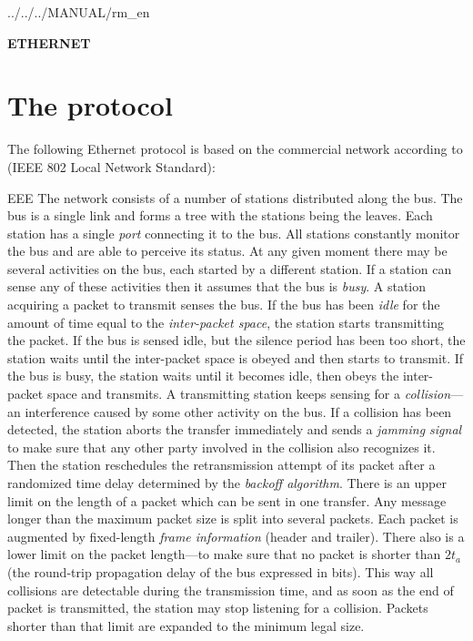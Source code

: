  {../../../MANUAL/rm_en}



\begin{titlepage}

\vspace*{3.5in}
\begin{center}
\Huge\bf ETHERNET \vspace{0.25in}
\end{center}
\end{titlepage}

\section{The protocol}

The following Ethernet protocol is based on the commercial
network according to (IEEE 802 Local Network Standard):
\begin{llist}{EEE}
The network consists of a number of stations distributed along the bus.
The bus is a single link and forms a tree with the stations being the leaves.
Each station has a single {\em port} connecting it to the bus.
All stations constantly monitor the bus and are able to perceive its
status.
At any given moment there may be
several activities on the bus, each started by a different station.
If a station can sense any of these activities
then it assumes that the bus is {\em busy}.
A station acquiring a packet to transmit senses the bus.
If the bus has been {\em idle} for the amount of time equal to the
{\em inter-packet space}, the station starts transmitting the packet.
If the bus is sensed idle, but the silence period has been too short,
the station waits until the inter-packet space is obeyed and then starts to
transmit.
If the bus is busy, the station waits until it becomes idle, then obeys the
inter-packet space and transmits.
A transmitting station keeps sensing for a {\em collision\/}---an
interference caused by some other activity on the bus.
If a collision has been detected, the station
aborts the transfer immediately and sends a
{\em jamming signal} to make sure that
any other party involved in the collision also recognizes it.
Then the station reschedules the retransmission attempt of its packet after
a randomized time delay determined by the {\em backoff algorithm}.
There is an upper limit on the length of a packet which can be sent in one
transfer.
Any message longer than the maximum packet size is split into several packets.
Each packet is
augmented by fixed-length {\em frame information} (header and trailer).
There also is a lower limit on the
packet length---to make sure that no packet is shorter than
$2t_a$ (the round-trip propagation delay of the bus expressed in bits).
This way all collisions are detectable during the
transmission time, and
as soon as the end of packet is transmitted, the station may stop listening for
a collision.
Packets shorter than that limit are expanded to the minimum legal size.
\end{llist}

